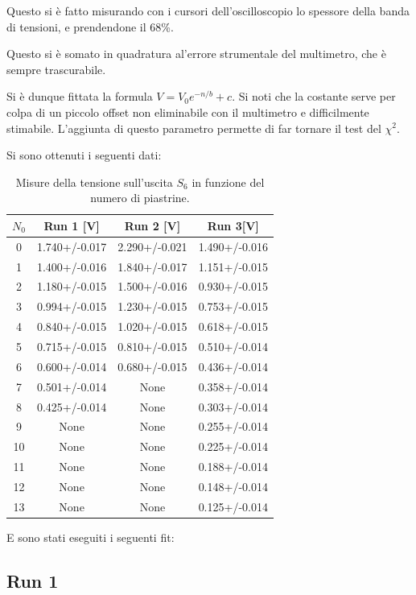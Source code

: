 \documentclass[a4paper,10pt]{article}
\begin{document}
Questo si è fatto misurando con i cursori dell'oscilloscopio lo spessore della banda di tensioni, e prendendone il 68\%. %


Questo si è somato in quadratura al'errore strumentale del multimetro, che è sempre trascurabile. 

Si è dunque fittata la formula $V=V_0e^{-n/b}+c$. Si noti che la costante serve per colpa di un piccolo offset non eliminabile con il multimetro e difficilmente stimabile. L'aggiunta di questo parametro permette di far tornare il test del $\chi^2$. 

Si sono ottenuti i seguenti dati:

\begin{table}[H]
	\centering
	\begin{tabular}{cccc}
		$ N_0 $ & Run 1 [V]& Run 2 [V]& Run 3[V]\\
		\hline
		0 & 1.740+/-0.017 & 2.290+/-0.021 & 1.490+/-0.016\\
		1 & 1.400+/-0.016 & 1.840+/-0.017 & 1.151+/-0.015\\
		2 & 1.180+/-0.015 & 1.500+/-0.016 & 0.930+/-0.015\\
		3 & 0.994+/-0.015 & 1.230+/-0.015 & 0.753+/-0.015\\
		4 & 0.840+/-0.015 & 1.020+/-0.015 & 0.618+/-0.015\\
		5 & 0.715+/-0.015 & 0.810+/-0.015 & 0.510+/-0.014\\
		6 & 0.600+/-0.014 & 0.680+/-0.015 & 0.436+/-0.014\\
		7 & 0.501+/-0.014 & None & 0.358+/-0.014\\
		8 & 0.425+/-0.014 & None & 0.303+/-0.014\\
		9 & None & None & 0.255+/-0.014\\
		10 & None & None & 0.225+/-0.014\\
		11 & None & None & 0.188+/-0.014\\
		12 & None & None & 0.148+/-0.014\\
		13 & None & None & 0.125+/-0.014\\	
	\end{tabular}
\caption{Misure della tensione sull'uscita $ S_6 $ in funzione del numero di piastrine.}
\label{tab:misurine}
\end{table}

E sono stati eseguiti i seguenti fit:

\subsection{Run 1}
\end{document}
